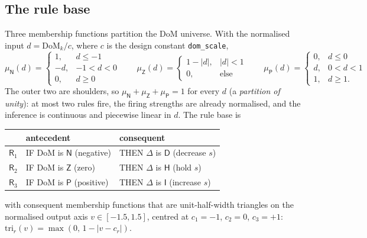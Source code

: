 \subsection{The rule base}
Three membership functions partition the DoM universe.  With the normalised input
$d = \mathrm{DoM}_k/c$, where $c$ is the design constant \texttt{dom\_scale},
\begin{equation}
\mu_{\mathsf N}(d) = \begin{cases}1,& d\le-1\\ -d,& -1<d<0\\ 0,& d\ge0\end{cases}
\qquad
\mu_{\mathsf Z}(d) = \begin{cases}1-|d|,& |d|<1\\ 0,&\text{else}\end{cases}
\qquad
\mu_{\mathsf P}(d) = \begin{cases}0,& d\le0\\ d,& 0<d<1\\ 1,& d\ge1 .\end{cases}
\label{eq:fz:mf}
\end{equation}
The outer two are shoulders, so $\mu_{\mathsf N}+\mu_{\mathsf Z}+\mu_{\mathsf P}=1$ for every $d$
(a \emph{partition of unity}): at most two rules fire, the firing strengths are already normalised,
and the inference is continuous and piecewise linear in $d$.  The rule base is
\begin{center}
\begin{tabular}{@{}lll@{}}
\toprule
& antecedent & consequent \\
\midrule
$\mathsf{R}_1$ & IF $\mathrm{DoM}$ is $\mathsf N$ (negative) & THEN $\Delta$ is $\mathsf D$ (decrease $s$) \\
$\mathsf{R}_2$ & IF $\mathrm{DoM}$ is $\mathsf Z$ (zero)     & THEN $\Delta$ is $\mathsf H$ (hold $s$) \\
$\mathsf{R}_3$ & IF $\mathrm{DoM}$ is $\mathsf P$ (positive) & THEN $\Delta$ is $\mathsf I$ (increase $s$) \\
\bottomrule
\end{tabular}
\end{center}
with consequent membership functions that are unit-half-width triangles on the normalised output
axis $v\in[-1.5,1.5]$, centred at $c_1=-1$, $c_2=0$, $c_3=+1$:
$\mathrm{tri}_r(v)=\max(0,\,1-|v-c_r|)$.

